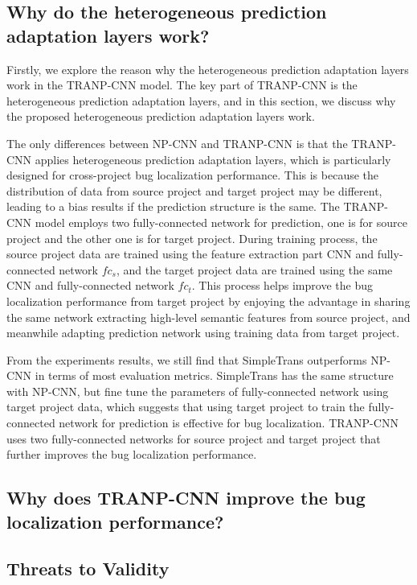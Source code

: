 \subsection{Why do the heterogeneous prediction adaptation layers work? }
Firstly, we explore the reason why the heterogeneous prediction adaptation layers work in the TRANP-CNN model. The key part of TRANP-CNN is the heterogeneous prediction adaptation layers, and in this section, we discuss why the proposed heterogeneous prediction adaptation layers work. 

The only differences between NP-CNN and TRANP-CNN is that the TRANP-CNN applies heterogeneous prediction adaptation layers, which is particularly designed for cross-project bug localization performance. This is because the distribution of data from source project and target project may be different, leading to a bias results if the prediction structure is the same. The TRANP-CNN model employs two fully-connected network for prediction, one is for source project and the other one is for target project. During training process, the source project data are trained using the feature extraction part CNN and fully-connected network $fc_s$, and the target project data are trained using the same CNN and fully-connected network $fc_t$. This process helps improve the bug localization performance from target project by enjoying the advantage in sharing the same network extracting high-level semantic features from source project, and meanwhile adapting prediction network using training data from target project. 

From the experiments results, we still find that SimpleTrans outperforms NP-CNN in terms of most evaluation metrics. SimpleTrans has the same structure with NP-CNN, but fine tune the parameters of fully-connected network using target project data, which suggests that using target project to train the fully-connected network for prediction is effective for bug localization. TRANP-CNN uses two fully-connected networks for source project and target project that further improves the bug localization performance. 

\subsection{Why does TRANP-CNN improve the bug localization performance?}

\subsection{Threats to Validity}

